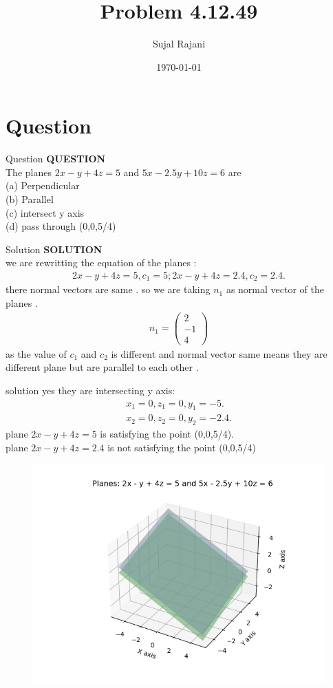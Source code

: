 \documentclass{beamer}
\title{Problem 4.12.49}
\author{Sujal Rajani}
\date{\today}
\theoremstyle{remark}
\newcommand{\myvec}[1]{\ensuremath{\begin{pmatrix}#1\end{pmatrix}}}
\numberwithin{equation}{section}
\begin{document}
\begin{frame}
\titlepage
\end{frame}

\section{Question}
\begin{frame}{Question}
\textbf{QUESTION}
\\
  The planes $2 x-y+4 z=5$ and $5x-2.5 y +10 z=6$ are 
  \\
   (a) Perpendicular
   \\
   (b) Parallel
   \\
   (c) intersect y axis
   \\
   (d) pass through (0,0,5/4)
\end{frame}
\begin{frame}{Solution}
\textbf{SOLUTION}
\\
we are rewritting the equation of the planes :
\begin{align*}
    2x-y+4z=5,c_1=5;2x-y+4z=2.4,c_2=2.4.
\end{align*}
there normal vectors are same .
so we are taking $n_1$ as normal vector of the planes .
\begin{align*}
   n_1=\myvec{2\\-1\\4}
\end{align*}
as the value of $c_1$ and  $c_2$ is different and normal vector same means they are different plane but are parallel to each other .
\end{frame}
\begin{frame}{solution}
yes they are intersecting y axis:
\begin{align*}
    x_1=0,z_1=0,y_1=-5.
\\
  x_2=0,z_2=0,y_2=-2.4.
\end{align*}
plane $2x-y+4z=5$ is satisfying the point (0,0,5/4).
\\
plane $2x-y+4z=2.4 $ is not satisfying the point (0,0,5/4)
     \end{frame}
       \begin{frame}[fragile]
    \begin{figure}[H]
    \centering
    \includegraphics[width = 0.6\columnwidth]{../figs/img.png}
    \caption*{}
    \label{figs}
\end{figure}
\end{frame}
\end{document}
